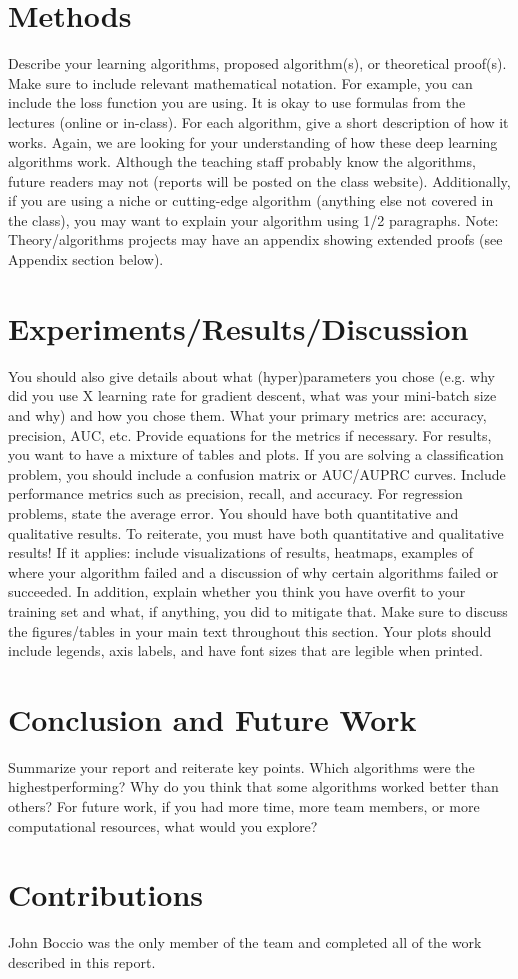 \documentclass{article}
\begin{document}
\section{ Methods }
Describe your learning algorithms, proposed algorithm(s), or theoretical proof(s). Make
sure to include relevant mathematical notation. For example, you can include the loss function you are using. It is okay to use formulas from the lectures (online or in-class). For each algorithm, give a short description 
of how it works. Again, we are looking for your understanding of how these deep
learning algorithms work. Although the teaching staff probably know the algorithms, future
readers may not (reports will be posted on the class website). Additionally, if you are
using a niche or cutting-edge algorithm (anything else not covered in the class), you may want to explain your algorithm using 1/2
paragraphs. Note: Theory/algorithms projects may have an appendix showing extended
proofs (see Appendix section below).

\section{Experiments/Results/Discussion}
You should also give details about what (hyper)parameters you chose (e.g. why did you
use X learning rate for gradient descent, what was your mini-batch size and why) and how
you chose them. What your primary metrics are: accuracy, precision,
AUC, etc. Provide equations for the metrics if necessary. For results, you want to have a
mixture of tables and plots. If you are solving a classification problem, you should include a
confusion matrix or AUC/AUPRC curves. Include performance metrics such as precision,
recall, and accuracy. For regression problems, state the average error. You should have
both quantitative and qualitative results. To reiterate, you must have both quantitative
and qualitative results! If it applies: include visualizations of results, heatmaps,
examples of where your algorithm failed and a discussion of why certain algorithms failed
or succeeded. In addition, explain whether you think you have overfit to your training set
and what, if anything, you did to mitigate that. Make sure to discuss the figures/tables in
your main text throughout this section. Your plots should include legends, axis labels, and
have font sizes that are legible when printed.

\section{Conclusion and Future Work}
Summarize your report and reiterate key points. Which algorithms were the highestperforming?
Why do you think that some algorithms worked better than others? For
future work, if you had more time, more team members, or more computational resources,
what would you explore?

\section{Contributions}
John Boccio was the only member of the team and completed all of the work described in this report.



\end{document}
